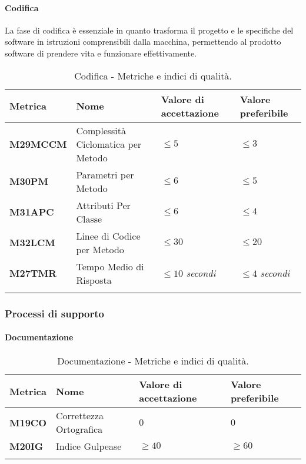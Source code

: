 \paragraph{Codifica}
La fase di codifica è essenziale in quanto trasforma il progetto e le specifiche del software in istruzioni comprensibili dalla macchina, permettendo al prodotto software di prendere vita e funzionare effettivamente.

\hspace{1pt}
    \begin{longtable}{|C{1.5cm}|L{3cm}|L{2.5cm}|L{2.5cm}|}
        \hline
        \textbf{Metrica} & \textbf{Nome} & \textbf{Valore di accettazione} & \textbf{Valore preferibile} \\
        \hline
        \textbf{M29MCCM} & Complessità Ciclomatica per Metodo & $\leq 5$ & $\leq 3$ \\
        \hline
        \textbf{M30PM} & Parametri per Metodo & $\leq 6$ & $\leq 5$ \\
        \hline
        \textbf{M31APC} & Attributi Per Classe & $\leq 6$ & $\leq 4$ \\
        \hline
        \textbf{M32LCM} & Linee di Codice per Metodo & $\leq 30$ & $\leq 20$ \\
        \hline
        \textbf{M27TMR} & Tempo Medio di Risposta & $\leq 10$ \textit{secondi}  & $\leq 4$ \textit{secondi} \\
        \hline
    \caption{Codifica - Metriche e indici di qualità.}
    \label{tab:metriche}
\end{longtable}




\subsubsection{Processi di supporto}

\paragraph{Documentazione}
\hspace{1pt}
    \begin{longtable}{|C{1.5cm}|L{3cm}|L{2.5cm}|L{2.5cm}|}
        \hline
        \textbf{Metrica} & \textbf{Nome} & \textbf{Valore di accettazione} & \textbf{Valore preferibile} \\
        \hline
        \textbf{M19CO} & Correttezza Ortografica & $0$ & $0$ \\
        \hline
        \textbf{M20IG} & Indice Gulpease & $\geq 40$ & $\geq 60$ \\
        \hline
    \caption{Documentazione - Metriche e indici di qualità.}
    \label{tab:metriche_testo}
\end{longtable}

